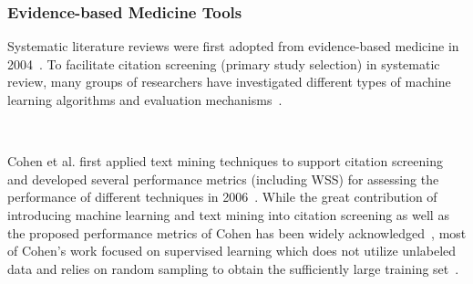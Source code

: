 \documentclass{svjour3}
\theoremstyle{break}
\newcommand{\respto}[1]{
\fcolorbox{black}{black!15}{
\label{response:#1}
\bf
  \scriptsize R-{#1}}~
}
\begin{document}


\subsubsection{Evidence-based Medicine Tools}
\label{sect: Evidence-based Medicine}

Systematic literature reviews were first adopted from evidence-based medicine in
2004~\cite{kitchenham2004evidence}. To facilitate citation screening (primary
study selection) in systematic review, many groups of researchers have investigated different types of machine learning algorithms and evaluation mechanisms~\cite{o2015using,paynter2016epc}. 

\respto{2a}
Cohen et al. first applied text mining techniques to support citation screening and developed several performance metrics (including WSS) for assessing the performance of different techniques in 2006~\cite{cohen2006reducing}. While the great contribution of introducing machine learning and text mining into citation screening as well as the proposed performance metrics of Cohen has been widely acknowledged~\cite{o2015using}, most of Cohen's work focused on supervised learning which does not utilize unlabeled data and relies on random sampling to obtain the sufficiently large training set~\cite{cohen2006reducing,cohen2006effective,cohen2010prospective,cohen2011performance}.
\end{document}
